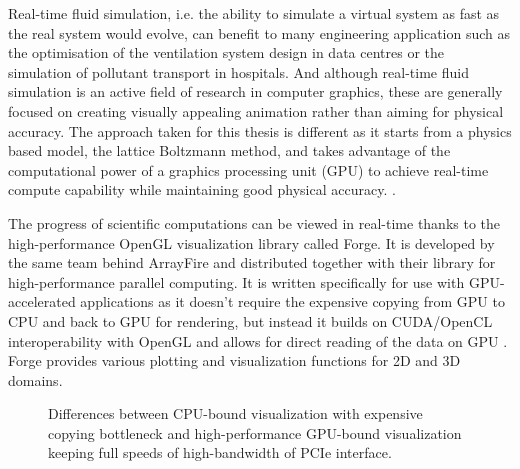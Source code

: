 Real-time fluid simulation, i.e. the ability to simulate a virtual system as fast as the real system would evolve, can benefit to many engineering application such as the optimisation of the ventilation system design in data centres or the simulation of pollutant transport in hospitals. And although real-time fluid simulation is an active field of research in computer graphics, these are generally focused on creating visually appealing animation rather than aiming for physical accuracy. The approach taken for this thesis is different as it starts from a physics based model, the lattice Boltzmann method, and takes advantage of the computational power of a graphics processing unit (GPU) to achieve real-time compute capability while maintaining good physical accuracy. \cite{delboscRealTimeSimulationIndoor}.

The progress of scientific computations can be viewed in real-time thanks to the high-performance OpenGL visualization library called Forge. It is developed by the same team behind ArrayFire and distributed together with their library for high-performance parallel computing. It is written specifically for use with GPU-accelerated applications as it doesn't require the expensive copying from GPU to CPU and back to GPU for rendering, but instead it builds on CUDA/OpenCL interoperability with OpenGL and allows for direct reading of the data on GPU \cite{forge2016}. Forge provides various plotting and visualization functions for 2D and 3D domains.

\begin{figure}[!ht]
	\centering
	 \qquad
	\caption{Differences between CPU-bound visualization with expensive copying bottleneck and high-performance GPU-bound visualization keeping full speeds of high-bandwidth of PCIe interface.}
	\label{fig:viz-forge-main}
\end{figure}

